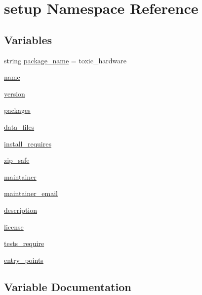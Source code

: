 \hypertarget{namespacesetup}{}\section{setup Namespace Reference}
\label{namespacesetup}
\subsection*{Variables}
\begin{DoxyCompactItemize}
\item 
string \mbox{\hyperlink{namespacesetup_ad184fbcf6c2a41dfeaea25210baf1d7b}{package\+\_\+name}} = \textquotesingle{}toxic\+\_\+hardware\textquotesingle{}
\item 
\mbox{\hyperlink{namespacesetup_ab74e6bf80237ddc4109968cedc58c151}{name}}
\item 
\mbox{\hyperlink{namespacesetup_a4c7a521b8f1a0769c09bfa4a1fca7dab}{version}}
\item 
\mbox{\hyperlink{namespacesetup_a5191bfd75a28371588f75471591d5500}{packages}}
\item 
\mbox{\hyperlink{namespacesetup_ab2a4f143e926c57a50df01bb182a4fd5}{data\+\_\+files}}
\item 
\mbox{\hyperlink{namespacesetup_a047d4e9f7b152e767f7bd459218fe1fd}{install\+\_\+requires}}
\item 
\mbox{\hyperlink{namespacesetup_a270a33302dcfe1b60738df9ebbfb2103}{zip\+\_\+safe}}
\item 
\mbox{\hyperlink{namespacesetup_aed90451693186afcd612a6e3422085c9}{maintainer}}
\item 
\mbox{\hyperlink{namespacesetup_a3fc04e51dfecacd97621c848af907697}{maintainer\+\_\+email}}
\item 
\mbox{\hyperlink{namespacesetup_a2661f439a4a94ffdcd5e47ae1da0bb1d}{description}}
\item 
\mbox{\hyperlink{namespacesetup_a4e659be027e258b72df12349200a263e}{license}}
\item 
\mbox{\hyperlink{namespacesetup_a04f3a03d8b124a11d2008f990fb6335d}{tests\+\_\+require}}
\item 
\mbox{\hyperlink{namespacesetup_a0afb2eb153236846e2dd516c55a0e0dd}{entry\+\_\+points}}
\end{DoxyCompactItemize}


\subsection{Variable Documentation}
\mbox{\label{namespacesetup_ab2a4f143e926c57a50df01bb182a4fd5}} 
